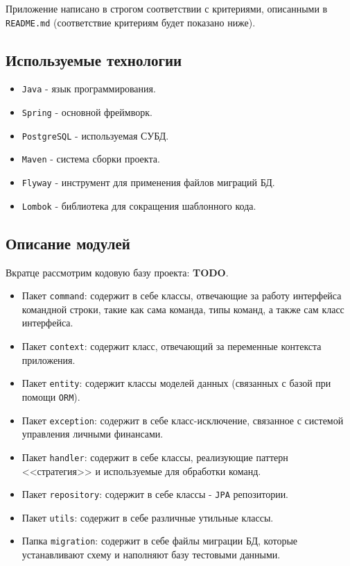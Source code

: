 \documentclass[a4paper, 14pt]{article}
\begin{document}
Приложение написано в строгом соответствии с критериями, описанными в \texttt{README.md} (соответствие критериям будет показано ниже).

\subsection{Используемые технологии}

\begin{itemize}
	\item \texttt{Java} - язык программирования.
	\item \texttt{Spring} - основной фреймворк.
	\item \texttt{PostgreSQL} - используемая СУБД.
	\item \texttt{Maven} - система сборки проекта.
	\item \texttt{Flyway} - инструмент для применения файлов миграций БД.
	\item \texttt{Lombok} - библиотека для сокращения шаблонного кода.
\end{itemize}

\subsection{Описание модулей}

Вкратце рассмотрим кодовую базу проекта: \textbf{TODO}.

\begin{itemize}
	\item Пакет \texttt{command}: содержит в себе классы, отвечающие за работу интерфейса командной строки, такие как сама команда, типы команд, а также сам класс интерфейса.
	\item Пакет \texttt{context}: содержит класс, отвечающий за переменные контекста приложения.
	\item Пакет \texttt{entity}: содержит классы моделей данных (связанных с базой при помощи \texttt{ORM}).
	\item Пакет \texttt{exception}: содержит в себе класс-исключение, связанное с системой управления личными финансами.
	\item Пакет \texttt{handler}: содержит в себе классы, реализующие паттерн <<стратегия>> и используемые для обработки команд.
	\item Пакет \texttt{repository}: содержит в себе классы - \texttt{JPA} репозитории.
	\item Пакет \texttt{utils}: содержит в себе различные утильные классы.
	\item Папка \texttt{migration}: содержит в себе файлы миграции БД, которые устанавливают схему и наполняют базу тестовыми данными.
\end{itemize}
\end{document}
